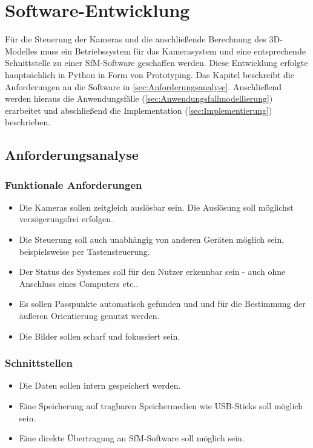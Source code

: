 \documentclass[./00_PhotoBox.tex]{subfiles}
\begin{document}
\chapter{Software-Entwicklung}
Für die Steuerung der Kameras und die anschließende Berechnung des 3D-Modelles muss ein Betriebssystem für das Kamerasystem und eine entsprechende Schnittstelle zu einer SfM-Software geschaffen werden. Diese Entwicklung erfolgte hauptsächlich in Python in Form von Prototyping. Das Kapitel beschreibt die Anforderungen an die Software in \autoref{sec:Anforderungsanalyse}. Anschließend werden hieraus die Anwendungsfälle (\autoref{sec:Anwendungsfallmodellierung}) erarbeitet und abschließend die Implementation (\autoref{sec:Implementierung}) beschrieben.

\section{Anforderungsanalyse}
\label{sec:Anforderungsanalyse}

\subsection{Funktionale Anforderungen}
\begin{itemize}
    \item Die Kameras sollen zeitgleich auslösbar sein. Die Auslösung soll möglichst ver\-zögerungs\-frei erfolgen.
    \item Die Steuerung soll auch unabhängig von anderen Geräten möglich sein, beispielsweise per Tastensteuerung.
    \item Der Status des Systemes soll für den Nutzer erkennbar sein - auch ohne Anschluss eines Computers etc..
    \item Es sollen Passpunkte automatisch gefunden und und für die Bestimmung der äußeren Orientierung genutzt werden.
    \item Die Bilder sollen scharf und fokussiert sein.
\end{itemize}

\subsection{Schnittstellen}
\begin{itemize}
    \item Die Daten sollen intern gespeichert werden.
    \item Eine Speicherung auf tragbaren Speichermedien wie USB-Sticks soll möglich sein.
    \item Eine direkte Übertragung an SfM-Software soll möglich sein.
\end{itemize}
\end{document}
